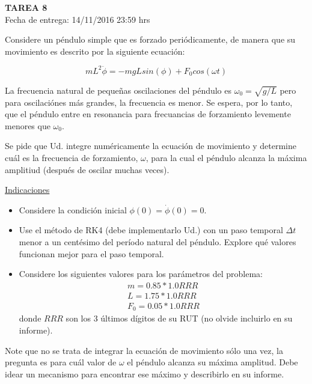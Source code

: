 \documentclass[letter, 11pt]{article}
\newcommand{\tareanro}{8}
\newcommand{\fechaentrega}{14/11/2016 23:59 hrs}
\begin{document}
\thispagestyle{firstpage}

\begin{center}
  {\uppercase{\LARGE \bf Tarea \tareanro}}\\
  Fecha de entrega: \fechaentrega
\end{center}



Considere un péndulo simple que es forzado periódicamente, de manera que su
movimiento es descrito por la siguiente ecuación:

$$ m L^2 \ddot{\phi} = -mgLsin(\phi) + F_0 cos(\omega t) $$

La frecuencia natural de pequeñas oscilaciones del péndulo es
$\omega_0=\sqrt{g/L}$ pero para oscilaciónes más grandes, la frecuencia es
menor. Se espera, por lo tanto, que el péndulo entre en resonancia para
frecuancias de forzamiento levemente menores que $\omega_0$.

Se pide que Ud. integre numéricamente la ecuación de movimiento y determine
cuál es la frecuencia de forzamiento, $\omega$, para la cual el péndulo alcanza
la máxima amplitiud (después de oscilar muchas veces).

\vspace{0.5em}
\noindent\underline{Indicaciones}

\begin{itemize}
  \item Considere la condición inicial $\phi(0) = \dot{\phi}(0) = 0$.
  \item Use el método de RK4 (debe implementarlo Ud.) con un paso temporal
    $\Delta t$ menor a un centésimo del período natural del péndulo. Explore
    qué valores funcionan mejor para el paso temporal.
  \item Considere los siguientes valores para los parámetros del problema:
    \begin{align*}
      m = 0.85 * 1.0RRR \\
      L = 1.75 * 1.0RRR \\
      F_0 = 0.05 * 1.0RRR
    \end{align*}
    donde $RRR$ son los 3 últimos dígitos de su RUT (no olvide incluirlo en su
    informe).
\end{itemize}

Note que no se trata de integrar la ecuación de movimiento sólo una vez, la
pregunta es para cuál valor de $\omega$ el péndulo alcanza su máxima amplitud.
Debe idear un mecanismo para encontrar ese máximo y describirlo en su informe.
\end{document}
